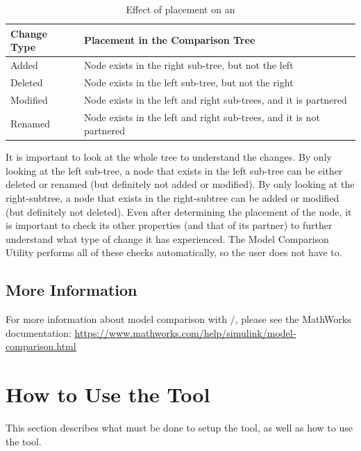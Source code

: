 \documentclass{article}
\makeatletter
\newcommand{\ToolName}{Model Comparison Utility\@\xspace}
\newcommand{\NodeObj}{\keyword{xmlcomp.Node}\@\xspace}
\makeatother
\begin{document}
\begin{table}[htb] 
\centering
\begin{tabular}{ll}
\hline 
Change Type & \NodeObj Placement in the Comparison Tree\\ \hline \hline
Added       & Node exists in the right sub-tree, but not the left \\ \hline
Deleted     & Node exists in the left sub-tree, but not the right \\ \hline
Modified    & Node exists in the left and right sub-trees, and it is partnered \\ \hline
Renamed     & Node exists in the left and right sub-trees, and it is not partnered \\ \hline                                                                       
\end{tabular}
\caption{Effect of placement on an \NodeObj}
\label{TBL:Placement}
\end{table}

It is important to look at the whole tree to understand the changes. By only looking at the left sub-tree, a node that exists in the left sub-tree can be either deleted or renamed (but definitely not added or modified). By only looking at the right-subtree, a node that exists in the right-subtree can be added or modified (but definitely not deleted). Even after determining the placement of the node, it is important to check its other properties (and that of its partner) to further understand what type of change it has experienced. The \ToolName performs all of these checks automatically, so the user does not have to.

\subsection{More Information}
For more information about model comparison with \Matlab/\Simulink, please see the MathWorks documentation: \newline
\url{https://www.mathworks.com/help/simulink/model-comparison.html}

\pagebreak	
\section{How to Use the Tool}
This section describes what must be done to setup the tool, as well as how to use the tool.
\end{document}
